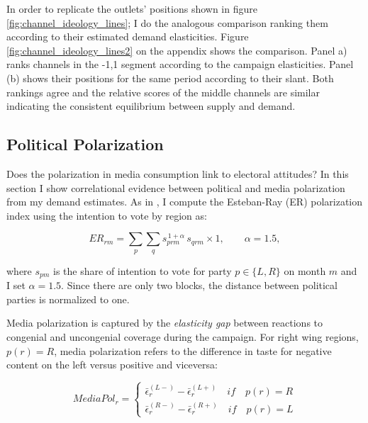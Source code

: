 \documentclass[12pt]{article}
\begin{document}
In order to replicate the outlets' positions shown in figure \ref{fig:channel_ideology_lines}; I do the analogous comparison ranking them according to their estimated demand elasticities. Figure \ref{fig:channel_ideology_lines2} on the appendix shows the comparison. Panel a) ranks channels in the -1,1 segment according to the campaign elasticities. Panel (b) shows their positions for the same period according to their slant. Both rankings agree and the relative scores of the middle channels are similar indicating the consistent equilibrium between supply and demand. 





	\subsection*{Political Polarization}
	
	
	

Does the polarization in media consumption link to electoral attitudes?  In this section I show correlational evidence between political and media polarization from my demand estimates. As in \cite{martin2017}, I compute  the Esteban-Ray (ER) polarization index \citep{esteban} using the intention to vote by region as:

\begin{equation}
	ER_{rm}  =	 \sum_{p}   \sum_{q}
	s_{prm}^{\,1+\alpha}\,s_{qrm} \times 1,\qquad \alpha = 1.5,
		\label{eq:er}
\end{equation}

where $s_{pm}$ is the share of intention to vote for party $p\in \{L,R\}$  on month $m$ and I set $\alpha=1.5$. Since there are only two blocks, the distance between political parties is normalized to one. 


Media polarization is captured by the \emph{elasticity gap} between reactions to congenial and uncongenial coverage during the campaign. For right wing regions, $p(r)=R$, media polarization refers to the difference in taste for negative content on the left versus positive and viceversa: 


\begin{equation}
	MediaPol_r  =	\begin{cases}
		\bar{\epsilon}_r^{(L-)}- \bar{\epsilon}_r^{(L+)} \quad if \quad p(r)=R\\
		\bar{\epsilon}_r^{(R-)}- \bar{\epsilon}_r^{(R+)} \quad if \quad p(r)=L
	\end{cases}
		\label{eq:mediapol}
\end{equation}
\end{document}
